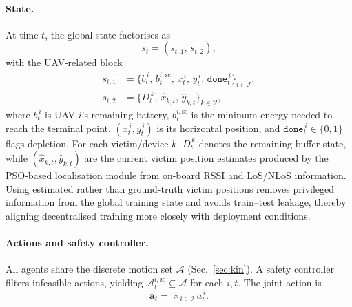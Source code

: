 \documentclass[drones,article,accept,pdftex,moreauthors]{Definitions/mdpi}
\begin{document}
\paragraph{State.}
At time $t$, the global state factorises as
\begin{equation}
s_t=(s_{t,1},\,s_{t,2}),
\label{eq:state_split}
\end{equation}
with the UAV-related block
\begin{subequations}\label{eq:state_blocks}
\begin{align}
s_{t,1}&=\big\{ b_t^{\,i},\, b_{t}^{i,\mathrm{sc}},\, x_t^{\,i},\, y_t^{\,i},\, \texttt{done}_t^{\,i} \big\}_{i\in\mathcal{I}}, \label{eq:state_uav}\\
s_{t,2}&=\big\{ D_t^{\,k},\, \hat x_{k,t},\, \hat y_{k,t} \big\}_{k\in\mathcal{V}}, \label{eq:state_dev}
\end{align}
\end{subequations}
where $b_t^{\,i}$ is UAV $i$’s remaining battery, $b_{t}^{i,\mathrm{sc}}$ is the minimum energy
needed to reach the terminal point, $(x_t^{\,i},y_t^{\,i})$ is its horizontal position, and
$\texttt{done}_t^{\,i}\!\in\!\{0,1\}$ flags depletion. For each victim/device $k$, $D_t^{\,k}$
denotes the remaining buffer state, while $(\hat x_{k,t},\hat y_{k,t})$ are the current
victim position estimates produced by the PSO-based localisation module from on-board
RSSI and LoS/NLoS information. Using estimated rather than ground-truth victim positions
removes privileged information from the global training state and avoids train--test leakage,
thereby aligning decentralised training more closely with deployment conditions.

\paragraph{Actions and safety controller.}
All agents share the discrete motion set $\mathcal{A}$ (Sec.~\ref{sec:kin}). A safety
controller filters infeasible actions, yielding $\mathcal{A}^{i,\mathrm{sc}}_t\subseteq\mathcal{A}$ for
each $i,t$. The joint action is
\begin{equation}
\mathbf{a}_t=\times_{i\in\mathcal{I}} a_t^{\,i}.
\label{eq:joint_action}
\end{equation}
\end{document}
